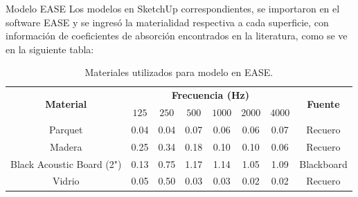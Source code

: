 \documentclass{sintefbeamer}
\begin{document}
\begin{frame}{Modelo EASE}
Los modelos en SketchUp correspondientes, se importaron en el software EASE y se ingresó la materialidad respectiva a cada superficie, con información de coeficientes de absorción encontrados en la literatura, como se ve en la siguiente tabla:
    \begin{table}[H]
    \centering
        \begin{tabular}{|c|cccccc|c|}
        \hline
        \multirow{2}{*}{\textbf{Material}} & \multicolumn{6}{c|}{\textbf{Frecuencia (Hz)}}                                                                          & \multirow{2}{*}{\textbf{Fuente}} \\ \cline{2-7} 
                & \multicolumn{1}{c|}{$125$} & \multicolumn{1}{c|}{$250$} & \multicolumn{1}{c|}{$500$} & \multicolumn{1}{c|}{$1000$} & \multicolumn{1}{c|}{$2000$} & $4000$ & \\ \hline
        Parquet & \multicolumn{1}{c|}{0.04} & \multicolumn{1}{c|}{0.04} & \multicolumn{1}{c|}{0.07} & \multicolumn{1}{c|}{0.06} & \multicolumn{1}{c|}{0.06} &  0.07 & Recuero\\ \hline
        Madera  & \multicolumn{1}{c|}{0.25} & \multicolumn{1}{c|}{0.34} & \multicolumn{1}{c|}{0.18} & \multicolumn{1}{c|}{0.10} & \multicolumn{1}{c|}{0.10} &  0.06 & Recuero\\  \hline
        Black Acoustic Board (2") & \multicolumn{1}{c|}{0.13} & \multicolumn{1}{c|}{0.75} & \multicolumn{1}{c|}{1.17} & \multicolumn{1}{c|}{1.14} & \multicolumn{1}{c|}{1.05} & 1.09 & Blackboard\\ \hline
        Vidrio  & \multicolumn{1}{c|}{0.05} & \multicolumn{1}{c|}{0.50} & \multicolumn{1}{c|}{0.03} & \multicolumn{1}{c|}{0.03} & \multicolumn{1}{c|}{0.02} & 0.02 & Recuero\\ \hline
        \end{tabular}
        \caption{Materiales utilizados para modelo en EASE.}
        \label{tab:materiales-ease}
    \end{table}
\end{frame}
\end{document}
